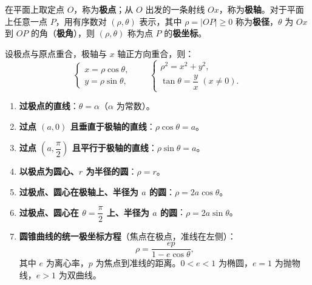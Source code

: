 \documentclass[12pt,a4paper]{ctexart}
\theoremstyle{definition}
\begin{document}
\begin{definition}
  在平面上取定点 $O$，称为\textbf{极点}；从 $O$ 出发的一条射线 $Ox$，称为\textbf{极轴}。对于平面上任意一点 $P$，用有序数对 $(\rho,\theta)$ 表示，其中 $\rho = |OP| \geqslant 0$ 称为\textbf{极径}，$\theta$ 为 $Ox$ 到 $OP$ 的角（\textbf{极角}），则 $(\rho,\theta)$ 称为点 $P$ 的\textbf{极坐标}。
\end{definition}

\begin{knowledge}
  设极点与原点重合，极轴与 $x$ 轴正方向重合，则：
  \[
    \begin{cases}
      x = \rho\cos\theta, \\
      y = \rho\sin\theta,
    \end{cases}
    \qquad
    \begin{cases}
      \rho^2 = x^2 + y^2, \\[3pt]
      \tan\theta = \dfrac{y}{x}\;(x \neq 0).
    \end{cases}
  \]
\end{knowledge}

\begin{knowledge}
  \begin{enumerate}[leftmargin=2em]
    \item \textbf{过极点的直线}：$\theta = \alpha$（$\alpha$ 为常数）。

    \item \textbf{过点 $(a,0)$ 且垂直于极轴的直线}：$\rho\cos\theta = a$。

    \item \textbf{过点 $(a,\dfrac{\pi}{2})$ 且平行于极轴的直线}：$\rho\sin\theta = a$。

    \item \textbf{以极点为圆心、$r$ 为半径的圆}：$\rho = r$。

    \item \textbf{过极点、圆心在极轴上、半径为 $a$ 的圆}：$\rho = 2a\cos\theta$。

    \item \textbf{过极点、圆心在 $\theta=\dfrac{\pi}{2}$ 上、半径为 $a$ 的圆}：$\rho = 2a\sin\theta$。

    \item \textbf{圆锥曲线的统一极坐标方程}（焦点在极点，准线在左侧）：
    \[
      \rho = \frac{ep}{1 - e\cos\theta},
    \]
    其中 $e$ 为离心率，$p$ 为焦点到准线的距离。$0<e<1$ 为椭圆，$e=1$ 为抛物线，$e>1$ 为双曲线。
  \end{enumerate}
\end{knowledge}
\end{document}
